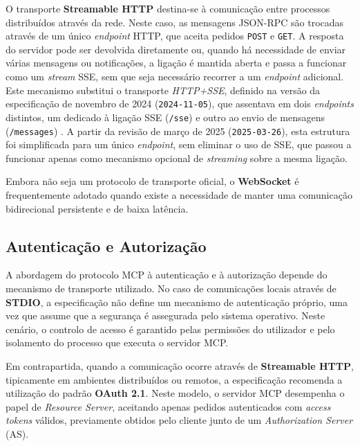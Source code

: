 O transporte \textbf{Streamable HTTP} destina-se à comunicação entre processos
distribuídos através da rede. Neste caso, as mensagens JSON-RPC são trocadas através
de um único \textit{endpoint} HTTP, que aceita pedidos \texttt{POST} e \texttt{GET}.
A resposta do servidor pode ser devolvida diretamente ou, quando há necessidade de enviar várias mensagens ou notificações, a ligação é mantida aberta e passa a funcionar como um \textit{stream} SSE, sem que seja necessário recorrer a um \textit{endpoint} adicional. Este mecanismo substitui o transporte 
\textit{HTTP+SSE}, definido na versão da especificação de novembro de 2024
(\texttt{2024-11-05}), que assentava em dois \textit{endpoints} distintos, um
dedicado à ligação SSE (\texttt{/sse}) e outro ao envio de mensagens
(\texttt{/messages}) \cite{mcp_architecture}. A partir da revisão de março de 2025
(\texttt{2025-03-26}), esta estrutura foi simplificada para um único
\textit{endpoint}, sem eliminar o uso de SSE, que passou a funcionar apenas como
mecanismo opcional de \textit{streaming} sobre a mesma ligação.

Embora não seja um protocolo de transporte oficial, o \textbf{WebSocket} é frequentemente adotado quando existe a necessidade de manter uma comunicação bidirecional persistente e de baixa latência.

\subsection{Autenticação e Autorização}

A abordagem do protocolo MCP à autenticação e à autorização depende do mecanismo
de transporte utilizado. No caso de comunicações locais através de
\textbf{STDIO}, a especificação não define um mecanismo de autenticação próprio,
uma vez que assume que a segurança é assegurada pelo sistema operativo. Neste
cenário, o controlo de acesso é garantido pelas permissões do utilizador e pelo
isolamento do processo que executa o servidor MCP.

Em contrapartida, quando a comunicação ocorre através de
\textbf{Streamable HTTP}, tipicamente em ambientes distribuídos ou remotos, a
especificação recomenda a utilização do padrão \textbf{OAuth 2.1}\cite{oauth_resource_server}. Neste modelo,
o servidor MCP desempenha o papel de \textit{Resource Server}, aceitando apenas
pedidos autenticados com \textit{access tokens} válidos, previamente obtidos
pelo cliente junto de um \textit{Authorization Server} (AS).

